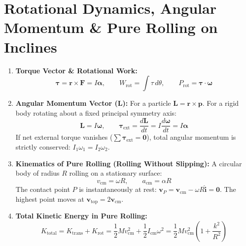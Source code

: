 \documentclass[10pt,twoside,openright]{book}
\begin{document}
\section{Rotational Dynamics, Angular Momentum \& Pure Rolling on Inclines}

\begin{conceptbox}
\begin{enumerate}[leftmargin=*]
  \item \textbf{Torque Vector \& Rotational Work:}
  \begin{equation}
    \boldsymbol{\tau} = \mathbf{r} \times \mathbf{F} = I\boldsymbol{\alpha}, \qquad W_{\text{rot}} = \int \tau\,d\theta, \qquad P_{\text{rot}} = \boldsymbol{\tau} \cdot \boldsymbol{\omega}
  \end{equation}
  \item \textbf{Angular Momentum Vector ($\mathbf{L}$):} For a particle $\mathbf{L} = \mathbf{r}\times\mathbf{p}$. For a rigid body rotating about a fixed principal symmetry axis:
  \begin{equation}
    \mathbf{L} = I\boldsymbol{\omega}, \qquad \boldsymbol{\tau}_{\text{ext}} = \frac{d\mathbf{L}}{dt} = I\frac{d\boldsymbol{\omega}}{dt} = I\boldsymbol{\alpha}
  \end{equation}
  If net external torque vanishes ($\sum \boldsymbol{\tau}_{\text{ext}} = \mathbf{0}$), total angular momentum is strictly conserved: $I_1 \omega_1 = I_2 \omega_2$.
  \item \textbf{Kinematics of Pure Rolling (Rolling Without Slipping):}
  A circular body of radius $R$ rolling on a stationary surface:
  \begin{equation}
    v_{\text{cm}} = \omega R, \qquad a_{\text{cm}} = \alpha R
  \end{equation}
  The contact point $P$ is instantaneously at rest: $\mathbf{v}_P = \mathbf{v}_{\text{cm}} - \omega R\hat{\mathbf{i}} = \mathbf{0}$. The highest point moves at $\mathbf{v}_{\text{top}} = 2\mathbf{v}_{\text{cm}}$.
  \item \textbf{Total Kinetic Energy in Pure Rolling:}
  \begin{equation}
    K_{\text{total}} = K_{\text{trans}} + K_{\text{rot}} = \frac{1}{2}M v_{\text{cm}}^2 + \frac{1}{2}I_{\text{cm}}\omega^2 = \frac{1}{2}M v_{\text{cm}}^2\left(1 + \frac{k^2}{R^2}\right)
  \end{equation}
\end{enumerate}
\end{conceptbox}
\end{document}
